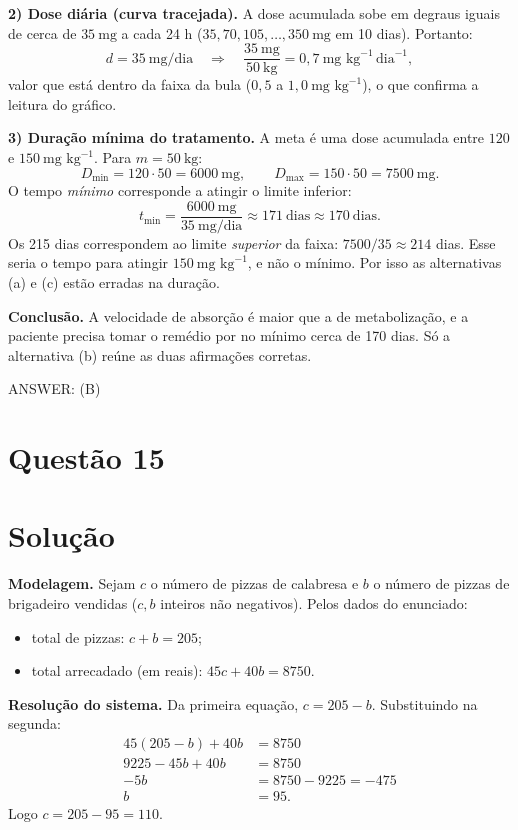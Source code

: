 \documentclass{article}%
\begin{document}
\textbf{2) Dose diária (curva tracejada).}
A dose acumulada sobe em degraus iguais de cerca de $35\ \text{mg}$ a cada 24 h ($35, 70, 105, \dots, 350\ \text{mg}$ em 10 dias). Portanto:
\[
d = 35\ \text{mg/dia} \quad\Rightarrow\quad \frac{35\ \text{mg}}{50\ \text{kg}} = 0{,}7\ \text{mg kg}^{-1}\,\text{dia}^{-1},
\]
valor que está dentro da faixa da bula ($0{,}5$ a $1{,}0\ \text{mg kg}^{-1}$), o que confirma a leitura do gráfico.

\textbf{3) Duração mínima do tratamento.}
A meta é uma dose acumulada entre $120$ e $150\ \text{mg kg}^{-1}$. Para $m=50\ \text{kg}$:
\[
D_{\min} = 120 \cdot 50 = 6000\ \text{mg}, \qquad D_{\max} = 150 \cdot 50 = 7500\ \text{mg}.
\]
O tempo \emph{mínimo} corresponde a atingir o limite inferior:
\[
t_{\min} = \frac{6000\ \text{mg}}{35\ \text{mg/dia}} \approx 171\ \text{dias} \approx 170\ \text{dias}.
\]
Os 215 dias correspondem ao limite \emph{superior} da faixa: $7500/35 \approx 214$ dias. Esse seria o tempo para atingir $150\ \text{mg kg}^{-1}$, e não o mínimo. Por isso as alternativas (a) e (c) estão erradas na duração.

\textbf{Conclusão.} A velocidade de absorção é maior que a de metabolização, e a paciente precisa tomar o remédio por no mínimo cerca de 170 dias. Só a alternativa (b) reúne as duas afirmações corretas.

ANSWER: (B)%
\newpage%
\section*{Questão 15}

\section*{Solução}

\textbf{Modelagem.} Sejam $c$ o número de pizzas de calabresa e $b$ o número de pizzas de brigadeiro vendidas ($c,b$ inteiros não negativos). Pelos dados do enunciado:
\begin{itemize}
\item total de pizzas: $c+b=205$;
\item total arrecadado (em reais): $45c+40b=8750$.
\end{itemize}

\textbf{Resolução do sistema.} Da primeira equação, $c=205-b$. Substituindo na segunda:
\begin{align*}
45(205-b)+40b &= 8750\\
9225-45b+40b &= 8750\\
-5b &= 8750-9225=-475\\
b &= 95.
\end{align*}
Logo $c=205-95=110$.
\end{document}
